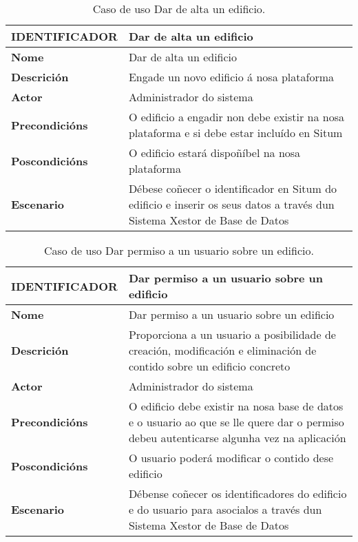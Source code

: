 \begin{table}[tbh]
	\footnotesize
	\centering
	\begin{tabular}{|l|p{10cm}|}
		\hline 
		\textbf{IDENTIFICADOR}	& \textbf{Dar de alta un edificio} \\ 
		\hline 
		\textbf{Nome} & Dar de alta un edificio \\ 
		\hline 
		\textbf{Descrición} & Engade un novo edificio á nosa plataforma \\ 
		\hline 
		\textbf{Actor} & Administrador do sistema \\ 
		\hline 
		\textbf{Precondicións} & O edificio a engadir non debe existir na nosa plataforma e si debe estar incluído en Situm \\ 
		\hline 
		\textbf{Poscondicións} & O edificio estará dispoñíbel na nosa plataforma \\ 
		\hline 
		\textbf{Escenario} & Débese coñecer o identificador en Situm do edificio e inserir os seus datos a través dun Sistema Xestor de Base de Datos \\ 
		\hline 
	\end{tabular}
	\caption{Caso de uso Dar de alta un edificio.}
	\label{tab:cuAltaEdificio}
\end{table}

\begin{table}[tbh]
	\footnotesize
	\centering
	\begin{tabular}{|l|p{10cm}|}
		\hline 
		\textbf{IDENTIFICADOR}	& \textbf{Dar permiso a un usuario sobre un edificio} \\ 
		\hline 
		\textbf{Nome} & Dar permiso a un usuario sobre un edificio \\ 
		\hline 
		\textbf{Descrición} & Proporciona a un usuario a posibilidade de creación, modificación e eliminación de contido sobre un edificio concreto \\ 
		\hline 
		\textbf{Actor} & Administrador do sistema \\ 
		\hline 
		\textbf{Precondicións} & O edificio debe existir na nosa base de datos e o usuario ao que se lle quere dar o permiso debeu autenticarse algunha vez na aplicación \\ 
		\hline 
		\textbf{Poscondicións} & O usuario poderá modificar o contido dese edificio \\ 
		\hline 
		\textbf{Escenario} & Débense coñecer os identificadores do edificio e do usuario para asocialos a través dun Sistema Xestor de Base de Datos \\ 
		\hline 
	\end{tabular}
	\caption{Caso de uso Dar permiso a un usuario sobre un edificio.}
	\label{tab:cuDarPermisoUsuarioEdificio}
\end{table}

